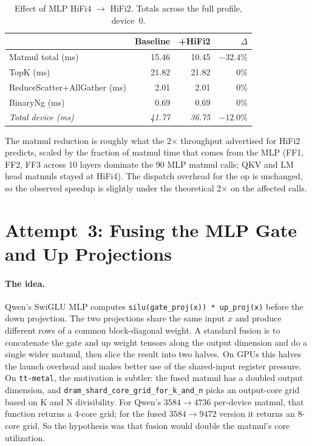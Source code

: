 \documentclass[sigplan,nonacm]{acmart}
\begin{document}
\begin{table}[h]
\centering
\small
\caption{Effect of MLP HiFi4 $\to$ HiFi2. Totals across the full
profile, device~0.}
\label{tab:hifi2}
\begin{tabular}{lrrr}
\toprule
 & Baseline & +HiFi2 & $\Delta$ \\
\midrule
Matmul total (ms)           & 15.46 & 10.45 & ${-}32.4\%$ \\
TopK (ms)                   & 21.82 & 21.82 & $0\%$       \\
ReduceScatter+AllGather (ms) & 2.01 &  2.01 & $0\%$       \\
BinaryNg (ms)               &  0.69 &  0.69 & $0\%$       \\
\midrule
\emph{Total device (ms)}    & \emph{41.77} & \emph{36.75} & $-12.0\%$ \\
\bottomrule
\end{tabular}
\end{table}

The matmul reduction is roughly what the 2$\times$ throughput
advertised for HiFi2 predicts, scaled by the fraction of matmul time
that comes from the MLP (FF1, FF2, FF3 across 10 layers dominate the
90 MLP matmul calls; QKV and LM head matmuls stayed at HiFi4). The
dispatch overhead for the op is unchanged, so the observed speedup is
slightly under the theoretical 2$\times$ on the affected calls.

\section{Attempt~3: Fusing the MLP Gate and Up Projections}
\label{sec:fusion}

\paragraph{The idea.} Qwen's SwiGLU MLP computes
\texttt{silu(gate\_proj(x)) * up\_proj(x)} before the down projection.
The two projections share the same input $x$ and produce different
rows of a common block-diagonal weight. A standard fusion is to
concatenate the gate and up weight tensors along the output dimension
and do a single wider matmul, then slice the result into two halves.
On GPUs this halves the launch overhead and makes better use of the
shared-input register pressure. On \texttt{tt-metal}, the motivation
is subtler: the fused matmul has a doubled output dimension, and
\texttt{dram\_shard\_core\_grid\_for\_k\_and\_n} picks an output-core
grid based on K and N divisibility. For Qwen's $3584 \to 4736$
per-device matmul, that function returns a 4-core grid; for the
fused $3584 \to 9472$ version it returns an 8-core grid. So the
hypothesis was that fusion would double the matmul's core
utilization.
\end{document}
